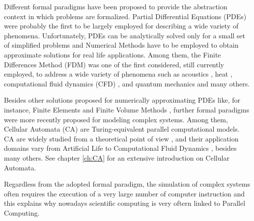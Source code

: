    Different formal paradigms have been proposed to provide the
  abstraction context in which problems are formalized. Partial
  Differential Equations (PDEs) were probably the first to be largely
  employed for describing a wide variety of phenomena. Unfortunately,
  PDEs can be analytically solved only for a small set of simplified
  problems \cite{Mazumder20161} and Numerical Methods have to be
  employed to obtain approximate solutions for real life applications. Among
  them, the Finite Differences Method (FDM) was one of the first
  considered, still currently employed, to address a wide variety of
  phenomena such as acoustics \cite{Chaigne19941112, Branski2014},
  heat \cite{Rana2012212, Sahin200619}, computational fluid dynamics
  (CFD) \cite{Chang1990317, Deng201390}, and quantum mechanics
  \cite{Hu2015640, Farrokhabadi201467} and many others.
  
  
  
Besides other solutions proposed for numerically approximating PDEs
  like, for instance, Finite Elements \cite{Hutton:2003} and Finite Volume Methods \cite{Moukalled:2015}, further formal paradigms were more recently proposed for modeling complex systems. Among them, Cellular Automata (CA) \cite{vonNeumann:1966:TSA:1102024} are Turing-equivalent \cite{Codd:1968:CA:1098682, Cook04a} parallel computational models. CA are widely studied from a theoretical point
  of view \cite{Wolfram-1984, Langton-1990b, Wolfram-2002,
    Ninagawa201542}, and their application domains vary from
  Artificial Life \cite{Langton-1986, Beer2004309} to Computational
  Fluid Dynamics \cite{Frish&al-1986, McNamara&Zanetti-1988,
    Higuera&Jimenez-1989, Aidun2010439}, besides many others. See chapter \ref{ch:CA} for an extensive introduction on Cellular Automata.
    
Regardless from the adopted formal paradigm, the simulation of
complex systems often requires the execution of a very large number of computer instruction and this explains why nowadays scientific computing is very oftern linked to  Parallel Computing. 

